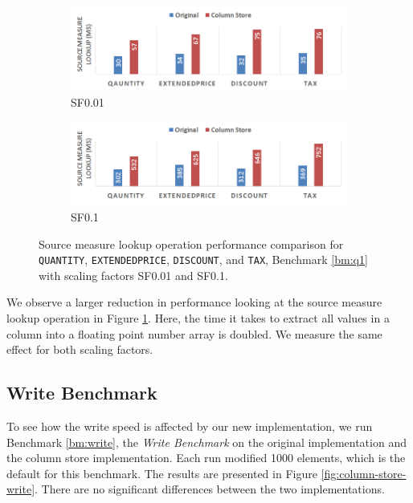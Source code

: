 \begin{figure}
    \centering
    \begin{subfigure}{1.0\textwidth}
        \includegraphics[width=\textwidth]{img/column-store-sml-sf001.png}
        \caption{SF0.01}
    \end{subfigure}
    \begin{subfigure}{1.0\textwidth}
        \includegraphics[width=\textwidth]{img/column-store-sml-sf010.png}
        \caption{SF0.1}
    \end{subfigure}
    \caption{Source measure lookup operation performance comparison for \texttt{QUANTITY}, \texttt{EXTENDEDPRICE}, \texttt{DISCOUNT}, and \texttt{TAX}, Benchmark \ref{bm:q1} with scaling factors SF0.01 and SF0.1.}
    \label{fig:column-store-sml}
\end{figure}

We observe a larger reduction in performance looking at the source measure lookup operation in Figure \ref{fig:column-store-sml}. Here, the time it takes to extract all values in a column into a floating point number array is doubled. We measure the same effect for both scaling factors.

\subsection{Write Benchmark}
\label{sub:Write Benchmark}
To see how the write speed is affected by our new implementation, we run Benchmark \ref{bm:write}, the \textit{Write Benchmark} on the original implementation and the column store implementation. Each run modified 1000 elements, which is the default for this benchmark. The results are presented in Figure \ref{fig:column-store-write}. There are no significant differences between the two implementations.

